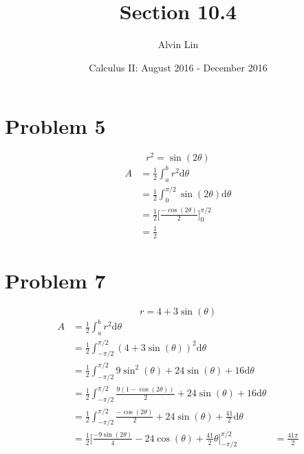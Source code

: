 \documentclass[letterpaper, 12pt]{article}
\title{Section 10.4}
\author{Alvin Lin}
\date{Calculus II: August 2016 - December 2016}
\newcommand*{\diff}{\mathrm{d}}
\begin{document}
\maketitle

\section*{Problem 5}
\[ r^{2} = \sin(2\theta) \]
\begin{align*}
  A &= \frac{1}{2}\int_{a}^{b}{r^{2}\diff{\theta}} \\
  &= \frac{1}{2}\int_{0}^{\pi/2}{\sin(2\theta)\diff{\theta}} \\
  &= \frac{1}{2}\bigg[\frac{-\cos(2\theta)}{2}\bigg]_{0}^{\pi/2} \\
  &= \frac{1}{2}
\end{align*}

\section*{Problem 7}
\[ r = 4+3\sin(\theta) \]
\begin{align*}
  A &= \frac{1}{2}\int_{a}^{b}{r^{2}\diff{\theta}} \\
  &= \frac{1}{2}\int_{-\pi/2}^{\pi/2}{(4+3\sin(\theta))^{2}\diff{\theta}} \\
  &= \frac{1}{2}\int_{-\pi/2}^{\pi/2}
    {9\sin^{2}(\theta)+24\sin(\theta)+16\diff{\theta}} \\
  &= \frac{1}{2}\int_{-\pi/2}^{\pi/2}
    {\frac{9(1-\cos(2\theta))}{2}+24\sin(\theta)+16\diff{\theta}} \\
  &= \frac{1}{2}\int_{-\pi/2}^{\pi/2}
    {\frac{-\cos(2\theta)}{2}+24\sin(\theta)+\frac{41}{2}\diff{\theta}} \\
  &= \frac{1}{2}\bigg[
    \frac{-9\sin(2\theta)}{4}-24\cos(\theta)+
      \frac{41}{2}\theta\bigg]_{-\pi/2}^{\pi/2}
  &= \frac{41\pi}{2}
\end{align*}
\end{document}
